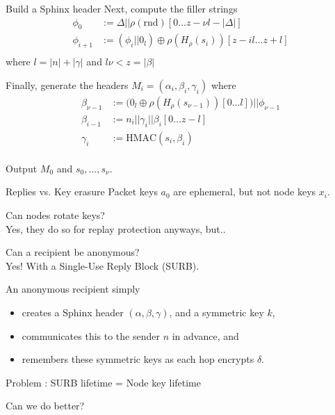 \documentclass[fleqn,xcolor={usenames,dvipsnames}]{beamer}
\begin{document}
\begin{frame}{Build a Sphinx header}
Next, compute the filler strings
\[ \begin{aligned}
 \phi_0 &:= \Delta || \rho(\textrm{rnd})[0 \ldots z - \nu l - |\Delta|] \\
 \phi_{i+1} &:= (\phi_i || 0_l) \oplus \rho(H_\rho(s_i))[ z-il \ldots z+l ] \\
\end{aligned} \]
where $l = |n| + |\gamma|$ and $l \nu < z = |\beta|$

\medskip

Finally, generate the headers $M_i = (\alpha_i,\beta_i,\gamma_i)$ where 
\[ \begin{aligned}
 \beta_{\nu-1} &:= \big( 0_l \oplus \rho(H_\rho(s_{\nu-1}))[ 0 \ldots l ] \big)
   || \phi_{\nu-1} \\
 \beta_{i-1} &:= n_i || \gamma_i || \beta_i[0 \ldots z-l] \\
 \gamma_i &:= \textrm{HMAC}(s_i,\beta_i) \\
\end{aligned} \]

\medskip
Output $M_0$ and $s_0,\ldots,s_\nu$.

\end{frame}


\begin{frame}[t]{Replies vs. Key erasure}
Packet keys $a_0$ are ephemeral, but not node keys $x_i$.  

\medskip

Can nodes rotate keys?  \\
Yes, they do so for replay protection anyways, but..

\bigskip
\pause

Can a recipient be anonymous? \\
Yes!  With a Single-Use Reply Block (SURB).

\medskip
An anonymous recipient simply
\begin{itemize}
\item creates a Sphinx header $(\alpha, \beta, \gamma)$, 
 and a symmetric key $k$, 
\item communicates this to the sender $n$ in advance, and 
\item remembers these symmetric keys as each hop encrypts $\delta$.
\end{itemize}

\bigskip
\pause

Problem : SURB lifetime = Node key lifetime

\medskip
\hspace*{80pt} Can we do better?

\end{frame}
\end{document}
